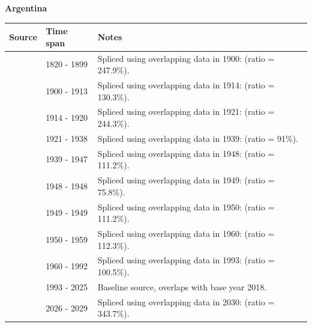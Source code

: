 \documentclass[12pt,a4paper,landscape]{article}
\begin{document}
\begin{adjustbox}{max totalsize={\paperwidth}{\paperheight},center}
\begin{minipage}[t][\textheight][t]{\textwidth}
\vspace*{0.5cm}
{}
\begin{center}
{\Large\bfseries Argentina}
\end{center}
\vspace{0.5cm}
\begin{table}[H]
\centering
\small
\begin{tabular}{|l|l|l|}
\hline
\textbf{Source} & \textbf{Time span} & \textbf{Notes} \\
\hline
\rowcolor{white}\cite{Tena}& 1820 - 1899 &Spliced using overlapping data in 1900: (ratio = 247.9\%).\\
\rowcolor{lightgray}\cite{UN_trade}& 1900 - 1913 &Spliced using overlapping data in 1914: (ratio = 130.3\%).\\
\rowcolor{white}\cite{Tena}& 1914 - 1920 &Spliced using overlapping data in 1921: (ratio = 244.3\%).\\
\rowcolor{lightgray}\cite{UN_trade}& 1921 - 1938 &Spliced using overlapping data in 1939: (ratio = 91\%).\\
\rowcolor{white}\cite{Mitchell}& 1939 - 1947 &Spliced using overlapping data in 1948: (ratio = 111.2\%).\\
\rowcolor{lightgray}\cite{UN_trade}& 1948 - 1948 &Spliced using overlapping data in 1949: (ratio = 75.8\%).\\
\rowcolor{white}\cite{Mitchell}& 1949 - 1949 &Spliced using overlapping data in 1950: (ratio = 111.2\%).\\
\rowcolor{lightgray}\cite{UN_trade}& 1950 - 1959 &Spliced using overlapping data in 1960: (ratio = 112.3\%).\\
\rowcolor{white}\cite{WDI}& 1960 - 1992 &Spliced using overlapping data in 1993: (ratio = 100.5\%).\\
\rowcolor{lightgray}\cite{OECD_EO}& 1993 - 2025 &Baseline source, overlaps with base year 2018.\\
\rowcolor{white}\cite{IMF_WEO_forecast}& 2026 - 2029 &Spliced using overlapping data in 2030: (ratio = 343.7\%).\\
\hline
\end{tabular}
\end{table}
\begin{figure}[H]
\centering

\end{figure}
\end{minipage}
\end{adjustbox}
\end{document}
